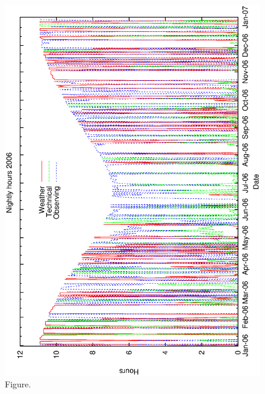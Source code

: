 \documentclass[12pt,a4paper]{article}
\begin{document}
\clearpage
\begin{figure}[htbp]
 \begin{center}
  \includegraphics[scale=1.0, angle=0]{figures/met_nightly_stats_g2006.eps}
 \end{center}
  \caption[Figure.]
{Figure.}
\end{figure}
\clearpage
\end{document}
